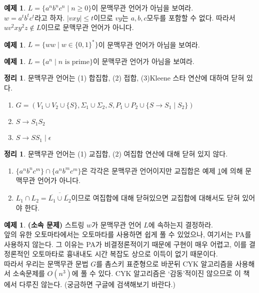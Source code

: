 \documentclass[b5paper, 10pt]{book}
\theoremstyle{definition}
\newtheorem{thm}[defn]{정리}
\newtheorem{ex}[defn]{예제}
\newenvironment{pf*}{\pushQED{\qed}\pf}{\popQED\endpf}
\begin{document}
\begin{ex} \label{anbncn}
    $L = \{a^n b^n c^n \;\vert\; n \ge 0 \}$이 문맥무관 언어가 아님을 보여라. \\ 
    $w = a^tb^tc^t$라고 하자. $\vert vxy \vert \le t$이므로 $vy$는 $a,b,c$모두를 포함할 수 없다.
    따라서 $uv^2 x y^2 z \notin L$이므로 문맥무관 언어가 아니다. 
\end{ex}
\begin{ex}
    $L = \{ww \;\vert\; w \in \{0,1\}^*\}$이 문맥무관 언어가 아님을 보여라. 
\end{ex}
\begin{ex}
    $L = \{a^n \;\vert\; n \text{ is prime}\}$이 문맥무관 언어가 아님을 보여라.
\end{ex}
\begin{thm}
    문맥무관 언어는 (1) 합집합, (2) 접합, (3)Kleene 스타 연산에 대하여 닫혀 있다.
\end{thm}
\begin{pf*}
    \begin{enumerate}
        \item $G = (V_1 \cup V_2 \cup \{S\}, \Sigma_1 \cup \Sigma_2, S,
         P_1 \cup P_2 \cup \{S \rightarrow S_1 \;\vert\; S_2\})$
        \item $S \rightarrow S_1S_2$
        \item $S \rightarrow SS_1 \;\vert\; \epsilon$
    \end{enumerate}
\end{pf*}
\begin{thm}
    문맥무관 언어는 (1) 교집합, (2) 여집합 연산에 대해 닫혀 있지 않다. 
\end{thm}
\begin{pf*}
    \begin{enumerate}
        \item $\{a^nb^nc^m\} \cap \{a^nb^mc^m\}$은 각각은 문맥무관 언어이지만 
        교집합은 예제 \ref{anbncn}에 의해 문맥무관 언어가 아니다.
        \item $L_1 \cap L_2 = \overline{\overline{L_1} \cup \overline{L_2}}$이므로 
        여집합에 대해 닫혀있으면
        교집합에 대해서도 닫혀 있어야 한다. 
    \end{enumerate}
\end{pf*}
\begin{ex}
    \textbf{(소속 문제)} 스트링 $w$가 문맥무관 언어 $L$에 속하는지 결정하라. \\ 
    앞의 유한 오토마타에서는 오토마타를 사용하면 쉽게 풀 수 있었으나, 여기서는 PA를 사용하지 않는다. 
    그 이유는 PA가 비결정론적이기 때문에 구현이 매우 어렵고, 이를 결정론적인 오토마타로 흉내내도 
    시간 복잡도 상으로 이득이 없기 때문이다. \\ 
    따라서 우리는 문맥무관 문법 $G$를 촘스키 표준형으로 바꾼뒤 
    CYK 알고리즘을 사용해서 소속문제를 $O(n^3)$에 풀 수 있다. 
    CYK 알고리즘은  `감동'적이진 않으므로 이 책에서 다루진 않는다. 
    (궁금하면 구글에 검색해보기 바란다.)
\end{ex}
\end{document}
